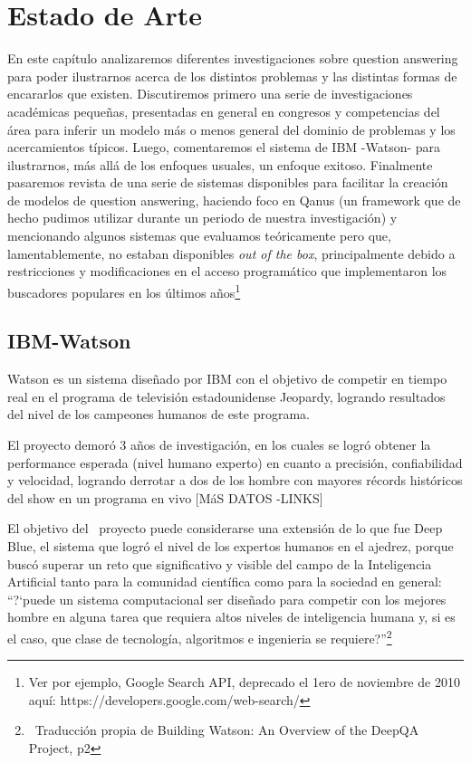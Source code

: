 \chapter{Estado de Arte}
\label{chap:estado-de-arte}
En este capítulo analizaremos diferentes investigaciones sobre question answering para poder ilustrarnos acerca de los distintos problemas y las distintas formas de encararlos que existen. Discutiremos primero una serie de investigaciones académicas pequeñas, presentadas en general en congresos y competencias del área para inferir un modelo más o menos general del dominio de problemas y los acercamientos típicos. Luego, comentaremos el sistema de IBM -Watson- para ilustrarnos, más allá de los enfoques usuales, un enfoque exitoso. Finalmente pasaremos revista de una serie de sistemas disponibles para facilitar la creación de modelos de question answering, haciendo foco en Qanus (un framework que de hecho pudimos utilizar durante un periodo de nuestra investigación) y mencionando algunos sistemas que evaluamos teóricamente pero que, lamentablemente, no estaban disponibles \textit{out of the box}, principalmente debido a restricciones y modificaciones en el acceso programático que implementaron los buscadores populares en los últimos años\footnote{Ver por ejemplo, Google Search API, deprecado el 1ero de noviembre de 2010 aquí: https://developers.google.com/web-search/}

\section{IBM-Watson}

Watson es un sistema diseñado por IBM con el objetivo de competir en
tiempo real en el programa de televisión estadounidense Jeopardy,
logrando resultados del nivel de los campeones humanos de este
programa.

El proyecto demoró 3 años de investigación, en los cuales se
logró obtener la performance esperada (nivel humano experto) en
cuanto a precisión, confiabilidad y velocidad, logrando derrotar a
dos de los hombre con mayores récords históricos del show en un
programa en vivo [MáS DATOS -LINKS]

El objetivo del \ proyecto puede considerarse una extensión de lo que
fue Deep Blue, el sistema que logró el nivel de los expertos humanos
en el ajedrez, porque buscó superar un reto que significativo y
visible del campo de la Inteligencia Artificial tanto para la comunidad
científica como para la sociedad en general:
{\textquotedblleft}?`puede un sistema computacional ser diseñado para
competir con los mejores hombre en alguna tarea que requiera altos
niveles de inteligencia humana y, si es el caso, que clase de
tecnología, algoritmos e ingenieria se
requiere?{\textquotedblright}\footnote{\ Traducción propia de
Building Watson: An Overview of the DeepQA Project, p2}


